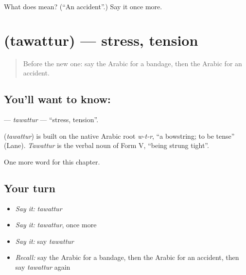 \begin{tcolorbox}[breakable,colback=teal!4,colframe=teal!35!black,title={Before you move on}]
What does  mean? (\textquotedblleft{}An accident\textquotedblright{}.) Say it once more.
\end{tcolorbox}
\section[\texorpdfstring{\ar{توتر} (tawattur)}{توتر (tawattur)}]{ (tawattur) — stress, tension}

\label{lesson:AR-C262-tawattur}



\begin{quote}
Before the new one: say the Arabic for a bandage, then the Arabic for an accident.
\end{quote}

\subsection*{You'll want to know: }
\textbf{} — \emph{tawattur} — \textquotedblleft{}stress, tension\textquotedblright{}.

\begin{cousinweb}
\textbf{} (\emph{tawattur}) is built on the native Arabic root \emph{w-t-r}, \textquotedblleft{}a bowstring; to be tense\textquotedblright{} (Lane). \emph{Tawattur} is the verbal noun of Form V, \textquotedblleft{}being strung tight\textquotedblright{}.
\end{cousinweb}

\begin{grammarlens}[title={What you've built}]
One more word for this chapter.
\end{grammarlens}

\subsection*{Your turn}
\begin{itemize}
\raggedright
  \item \emph{Say it:} \emph{tawattur}
  \item \emph{Say it:} \emph{tawattur}, once more
  \item \emph{Say it:} say \emph{tawattur}
  \item \emph{Recall:} say the Arabic for a bandage, then the Arabic for an accident, then say \emph{tawattur} again
\end{itemize}


